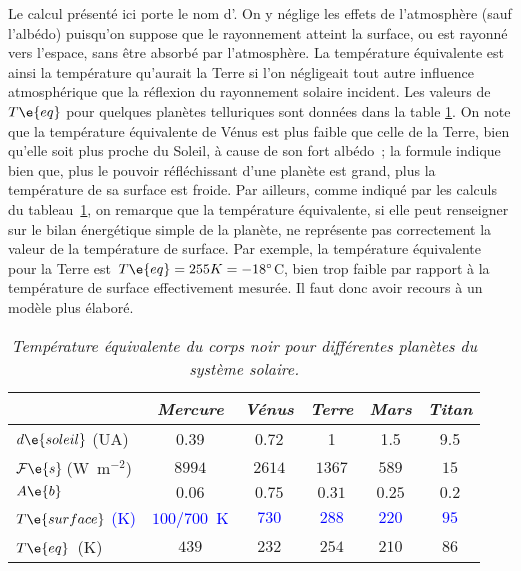 Le calcul présenté ici porte le nom d'. On y néglige les effets de l'atmosphère (sauf l'albédo) puisqu'on suppose que le rayonnement atteint la surface, ou est rayonné vers l'espace, sans être absorbé par l'atmosphère. La température équivalente est ainsi la température qu'aurait la Terre si l'on négligeait tout autre influence atmosphérique que la réflexion du rayonnement solaire incident. Les valeurs de $T\e{eq}$ pour quelques planètes telluriques sont données dans la table \ref{tab:planets}. On note que la température équivalente de Vénus est plus faible que celle de la Terre, bien qu'elle soit plus proche du Soleil, à cause de son fort albédo~; la formule indique bien que, plus le pouvoir réfléchissant d'une planète est grand, plus la température de sa surface est froide. Par ailleurs, comme indiqué par les calculs du tableau~\ref{tab:planets}, on remarque que la température équivalente, si elle peut renseigner sur le bilan énergétique simple de la planète, ne représente pas correctement la valeur de la température de surface. Par exemple, la température équivalente pour la Terre est~$T\e{eq} = 255 K = -18^{\circ}$C, bien trop faible par rapport à la température de surface effectivement mesurée. Il faut donc avoir recours à un modèle plus élaboré.

\begin{table}[h!] \label{tab:planets} \begin{center} \begin{tabular}{lccccc} & \emph{Mercure} & \emph{V\'enus} & \emph{Terre} & \emph{Mars} & \emph{ Titan} \\ \hline $d\e{soleil}$ (UA) & 0.39 & 0.72 & 1 & 1.5 & 9.5 \\ $\mathcal{F}\e{s}\,$(W~m$^{-2}$) & $8994$ & $2614$ & $1367$ & $589$ & $15$ \\ $A\e{b}$ & $0.06$ & $0.75$ & $0.31$ & $0.25$ & $0.2$ \\ \textcolor{blue}{$T\e{surface}$ (K)} & \textcolor{blue}{$100/700$~K} & \textcolor{blue}{$730$} & \textcolor{blue}{$288$} & \textcolor{blue}{$220$} & \textcolor{blue}{$95$} \\ \hline $T\e{eq}$~(K) & $439$ & $232$ & $254$ & $210$ & $86$\\ \end{tabular} \caption{\emph{Température équivalente du corps noir pour différentes planètes du système solaire.}} \end{center} \end{table}
